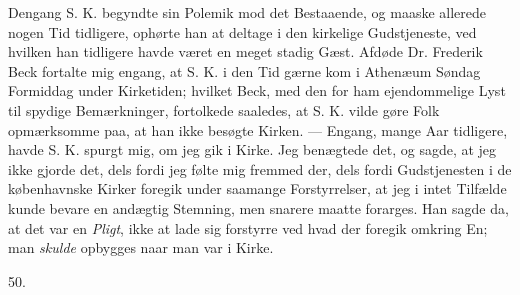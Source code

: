 \documentclass[12pt,a4paper,openany]{book}
\newcommand{\secnum}[1]{\par\begin{center}#1\end{center}\par\nobreak}
\newcommand{\opage}[1]{\marginnote{\footnotesize\textit{[#1]}}}
\begin{document}
Dengang S. K. begyndte sin Polemik mod det Bestaaende, og maaske allerede
nogen Tid tidligere, ophørte han at deltage i den kirkelige Gudstjeneste, ved
hvilken han tidligere havde været en meget stadig Gæst. Afdøde Dr. Frederik
Beck fortalte mig engang, at S. K. i den Tid gærne kom i Athenæum Søndag
Formiddag under Kirketiden; hvilket Beck, med den for ham ejendommelige Lyst
til spydige Bemærkninger, fortolkede
\opage{373}saaledes, at S. K. vilde gøre Folk opmærksomme paa, at han ikke
besøgte Kirken. --- Engang, mange Aar tidligere, havde S. K. spurgt mig, om
jeg gik i Kirke. Jeg benægtede det, og sagde, at jeg ikke gjorde det, dels
fordi jeg følte mig fremmed der, dels fordi Gudstjenesten i de københavnske
Kirker foregik under saamange Forstyrrelser, at jeg i intet Tilfælde kunde
bevare en andægtig Stemning, men snarere maatte forarges. Han sagde da, at
det var en \emph{Pligt}, ikke at lade sig forstyrre ved hvad der foregik
omkring En; man \emph{skulde} opbygges naar man var i Kirke.

\secnum{50.}
\end{document}
